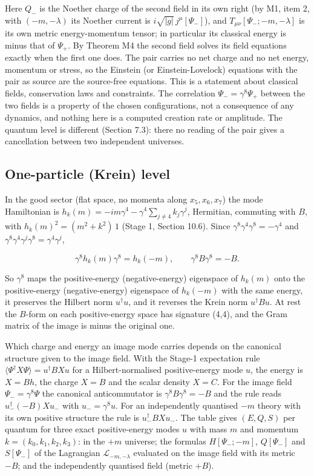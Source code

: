 \documentclass[11pt]{article}
\begin{document}
Here $Q_-$ is the Noether charge of the second field in its own right (by M1, item 2, with $(-m,-\lambda)$ its Noether current is $i\sqrt{|g|}\,j^\mu[\Psi_-]$), and $T_{\mu\nu}[\Psi_-;-m,-\lambda]$ is its own metric energy-momentum tensor; in particular its classical energy is minus that of $\Psi_+$. By Theorem M4 the second field solves its field equations exactly when the first one does. The pair carries no net charge and no net energy, momentum or stress, so the Einstein (or Einstein-Lovelock) equations with the pair as source are the source-free equations. This is a statement about classical fields, conservation laws and constraints. The correlation $\Psi_-=\gamma^8\Psi_+$ between the two fields is a property of the chosen configurations, not a consequence of any dynamics, and nothing here is a computed creation rate or amplitude. The quantum level is different (Section 7.3): there no reading of the pair gives a cancellation between two independent universes.

\subsection{One-particle (Krein) level}

In the good sector (flat space, no momenta along $x_5,x_6,x_7$) the mode Hamiltonian is $h_k(m)=-im\gamma^4-\gamma^4\sum_{j\ne4}k_j\gamma^j$, Hermitian, commuting with $B$, with $h_k(m)^2=(m^2+k^2)\,1$ (Stage 1, Section 10.6). Since $\gamma^8\gamma^4\gamma^8=-\gamma^4$ and $\gamma^8\gamma^4\gamma^j\gamma^8=\gamma^4\gamma^j$,

\[
\gamma^8h_k(m)\gamma^8=h_k(-m),\qquad \gamma^8B\gamma^8=-B .
\]

So $\gamma^8$ maps the positive-energy (negative-energy) eigenspace of $h_k(m)$ onto the positive-energy (negative-energy) eigenspace of $h_k(-m)$ with the same energy, it preserves the Hilbert norm $u^\dagger u$, and it reverses the Krein norm $u^\dagger Bu$. At rest the $B$-form on each positive-energy space has signature (4,4), and the Gram matrix of the image is minus the original one.

Which charge and energy an image mode carries depends on the canonical structure given to the image field. With the Stage-1 expectation rule $\langle\Psi^\dagger X\Psi\rangle=u^\dagger BXu$ for a Hilbert-normalised positive-energy mode $u$, the energy is $X=Bh$, the charge $X=B$ and the scalar density $X=C$. For the image field $\Psi_-=\gamma^8\Psi$ the canonical anticommutator is $\gamma^8B\gamma^8=-B$ and the rule reads $u_-^\dagger(-B)Xu_-$ with $u_-=\gamma^8u$. For an independently quantised $-m$ theory with its own positive structure the rule is $u_-^\dagger BXu_-$. The table gives $(E,Q,S)$ per quantum for three exact positive-energy modes $u$ with mass $m$ and momentum $k=(k_0,k_1,k_2,k_3)$: in the $+m$ universe; the formulas $H[\Psi_-;-m]$, $Q[\Psi_-]$ and $S[\Psi_-]$ of the Lagrangian $\mathcal L_{-m,-\lambda}$ evaluated on the image field with its metric $-B$; and the independently quantised field (metric $+B$).
\end{document}
